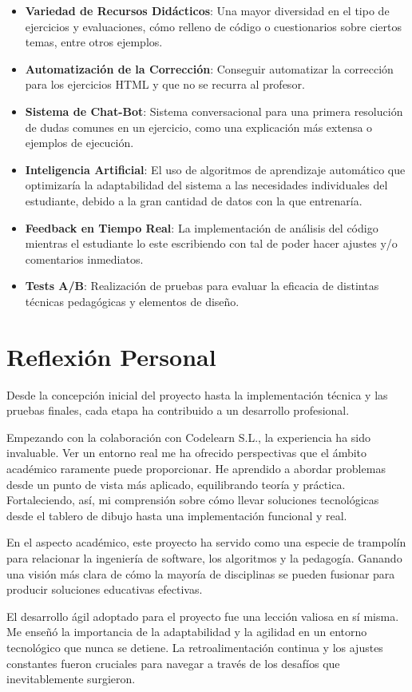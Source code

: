 \begin{itemize}
    \item \textbf{Variedad de Recursos Didácticos}: Una mayor diversidad en el tipo de ejercicios y evaluaciones, cómo relleno de código o cuestionarios sobre ciertos temas, entre otros ejemplos.
    \item \textbf{Automatización  de la Corrección}: Conseguir automatizar la corrección para los ejercicios HTML y que no se recurra al profesor. 
    \item \textbf{Sistema de Chat-Bot}: Sistema conversacional para una primera resolución de dudas comunes en un ejercicio, como una explicación más extensa o ejemplos de ejecución.  
    \item \textbf{Inteligencia Artificial}: El uso de algoritmos de aprendizaje automático que optimizaría la adaptabilidad del sistema a las necesidades individuales del estudiante, debido a la gran cantidad de datos con la que entrenaría.
    \item \textbf{Feedback en Tiempo Real}: La implementación de análisis del código mientras el estudiante lo este escribiendo con tal de poder hacer ajustes y/o comentarios inmediatos.
    \item \textbf{Tests A/B}: Realización de pruebas para evaluar la eficacia de distintas técnicas pedagógicas y elementos de diseño.
  \end{itemize}

\section{Reflexión Personal}
Desde la concepción inicial del proyecto hasta la implementación técnica y las pruebas finales, cada etapa ha contribuido a un desarrollo profesional.

Empezando con la colaboración con Codelearn S.L., la experiencia ha sido invaluable. Ver un entorno real me ha ofrecido perspectivas que el ámbito académico raramente puede proporcionar. He aprendido a abordar problemas desde un punto de vista más aplicado, equilibrando teoría y práctica. Fortaleciendo, así, mi comprensión sobre cómo llevar soluciones tecnológicas desde el tablero de dibujo hasta una implementación funcional y real.

En el aspecto académico, este proyecto ha servido como una especie de trampolín para relacionar la ingeniería de software, los algoritmos y la pedagogía. Ganando una visión más clara de cómo la mayoría de disciplinas se pueden fusionar para producir soluciones educativas efectivas. 

El desarrollo ágil adoptado para el proyecto fue una lección valiosa en sí misma. Me enseñó la importancia de la adaptabilidad y la agilidad en un entorno tecnológico que nunca se detiene. La retroalimentación continua y los ajustes constantes fueron cruciales para navegar a través de los desafíos que inevitablemente surgieron.

